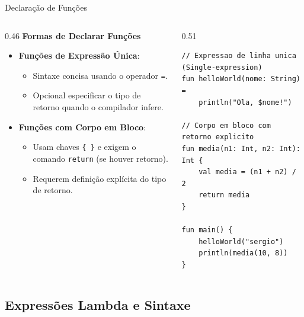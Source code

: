 \documentclass[aspectratio=169]{beamer}
\begin{document}
\begin{frame}[fragile]{Declaração de Funções}
  \begin{columns}[T]
    \begin{column}{0.46\textwidth}
      \textbf{Formas de Declarar Funções}
      \vspace{0.3em}
      \begin{itemize}\small
        \item \textbf{Funções de Expressão Única}:
          \begin{itemize}\footnotesize
            \item Sintaxe concisa usando o operador \texttt{=}.
            \item Opcional especificar o tipo de retorno quando o compilador infere.
          \end{itemize}
        \item \textbf{Funções com Corpo em Bloco}:
          \begin{itemize}\footnotesize
            \item Usam chaves \texttt{\{ \}} e exigem o comando \texttt{return} (se houver retorno).
            \item Requerem definição explícita do tipo de retorno.
          \end{itemize}
      \end{itemize}
    \end{column}
    \begin{column}{0.51\textwidth}
\begin{lstlisting}[style=KotlinStyle]
// Expressao de linha unica (Single-expression)
fun helloWorld(nome: String) = 
    println("Ola, $nome!")

// Corpo em bloco com retorno explicito
fun media(n1: Int, n2: Int): Int {
    val media = (n1 + n2) / 2
    return media
}

fun main() {
    helloWorld("sergio")
    println(media(10, 8))
}
\end{lstlisting}
    \end{column}
  \end{columns}
\end{frame}

\subsection{Expressões Lambda e Sintaxe}
\end{document}
